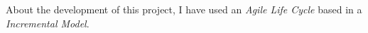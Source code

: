 
\newpage
About the development of this project, I have used an \emph{Agile Life Cycle} based in a \emph{Incremental Model}.


